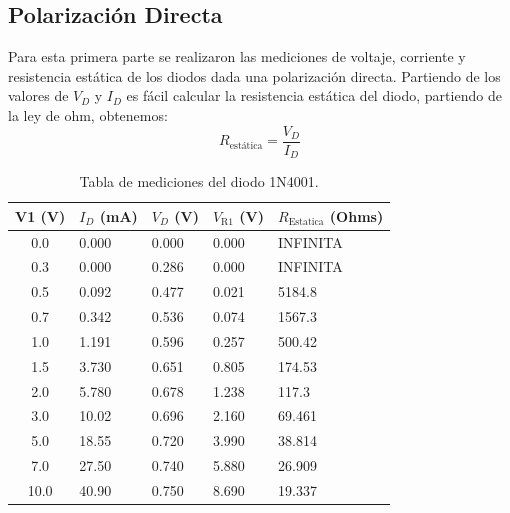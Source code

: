\documentclass[journal]{IEEEtran}
\begin{document}
\subsection{Polarización Directa}
Para esta primera parte se realizaron las mediciones de voltaje, corriente y resistencia estática de los diodos dada una polarización directa.
Partiendo de los valores de $V_D$ y $I_D$ es fácil calcular la resistencia estática del diodo, partiendo de la ley de ohm, obtenemos:
\begin{equation}
R_{\text{estática}} = \frac{V_D}{I_D}
\end{equation}

\begin{table}[H]
\centering
\begin{tabularx}{\columnwidth}{|c|X|X|X|X|}
\hline
\textbf{V1 (V)} & \textbf{$I_D$ (mA)} & \textbf{$V_D$ (V)} & \textbf{$V_\text{R1}$ (V)} & \textbf{$R_\text{Estatica}$ (Ohms)}\\ \hline
0.0 & 0.000 & 0.000  & 0.000 &  INFINITA\\ \hline
0.3 & 0.000 & 0.286  & 0.000 &  INFINITA\\ \hline
0.5 & 0.092 & 0.477  & 0.021 &  5184.8\\ \hline
0.7 & 0.342 & 0.536  & 0.074 &  1567.3\\ \hline
1.0 & 1.191 & 0.596  & 0.257 &  500.42\\ \hline
1.5 & 3.730 & 0.651  & 0.805 &  174.53\\ \hline
2.0 & 5.780 & 0.678  & 1.238 &  117.3\\ \hline
3.0 & 10.02 & 0.696  & 2.160 &  69.461\\ \hline
5.0 & 18.55 & 0.720  & 3.990 &  38.814\\ \hline
7.0 & 27.50 & 0.740  & 5.880 &  26.909\\ \hline
10.0& 40.90 & 0.750  & 8.690 &  19.337\\ \hline
\end{tabularx}
\caption{Tabla de mediciones del diodo 1N4001.}
\label{tablaDiodo4001}
\end{table}
\end{document}

